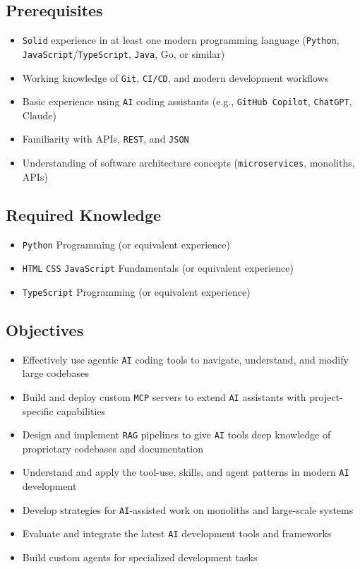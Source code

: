 \documentclass[
]{article}
\providecommand{\tightlist}{%
  \setlength{\itemsep}{0pt}\setlength{\parskip}{0pt}}
\begin{document}
\subsection{Prerequisites}\label{prerequisites}

\begin{itemize}
\tightlist
\item
  \texttt{Solid} experience in at least one modern programming language
  (\texttt{Python}, \texttt{JavaScript}/\texttt{TypeScript},
  \texttt{Java}, Go, or similar)
\item
  Working knowledge of \texttt{Git}, \texttt{CI/CD}, and modern
  development workflows
\item
  Basic experience using \texttt{AI} coding assistants (e.g.,
  \texttt{GitHub\ Copilot}, \texttt{ChatGPT}, Claude)
\item
  Familiarity with APIs, \texttt{REST}, and \texttt{JSON}
\item
  Understanding of software architecture concepts
  (\texttt{microservices}, monoliths, APIs)
\end{itemize}

\subsection{Required Knowledge}\label{required-knowledge}

\begin{itemize}
\tightlist
\item
  \texttt{Python} Programming (or equivalent experience)
\item
  \texttt{HTML} \texttt{CSS} \texttt{JavaScript} Fundamentals (or
  equivalent experience)
\item
  \texttt{TypeScript} Programming (or equivalent experience)
\end{itemize}

\subsection{Objectives}\label{objectives}

\begin{itemize}
\tightlist
\item
  Effectively use agentic \texttt{AI} coding tools to navigate,
  understand, and modify large codebases
\item
  Build and deploy custom \texttt{MCP} servers to extend \texttt{AI}
  assistants with project-specific capabilities
\item
  Design and implement \texttt{RAG} pipelines to give \texttt{AI} tools
  deep knowledge of proprietary codebases and documentation
\item
  Understand and apply the tool-use, skills, and agent patterns in
  modern \texttt{AI} development
\item
  Develop strategies for \texttt{AI}-assisted work on monoliths and
  large-scale systems
\item
  Evaluate and integrate the latest \texttt{AI} development tools and
  frameworks
\item
  Build custom agents for specialized development tasks
\end{itemize}
\end{document}
